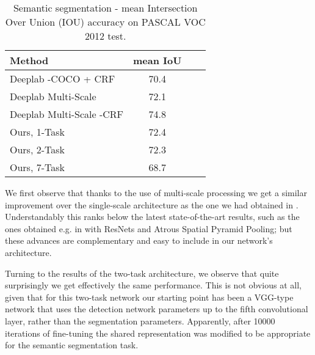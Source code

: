 \documentclass[10pt,twocolumn,letterpaper]{article}
\begin{document}
\begin{table}[!h]
	\begin{tabular}{|l|c|c|c|}
		\hline
	Method	& mean IoU \\\hline\hline
		Deeplab -COCO + CRF \cite{papa15}& 70.4\\\hline
		Deeplab Multi-Scale \cite{iclr16} & 72.1 \\
		Deeplab Multi-Scale -CRF \cite{iclr16} & 74.8 \\\hline
		Ours, 1-Task  & 72.4\\
		Ours, 2-Task  & 72.3\\
		Ours, 7-Task & 68.7 \\\hline
	\end{tabular}
	\caption{Semantic segmentation  - mean Intersection Over Union (IOU) accuracy on PASCAL VOC 2012 test.\label{table:results_e}}
\end{table}
We first observe that thanks to the use of multi-scale processing we get  a similar improvement over the single-scale architecture as the one we had obtained in \cite{iclr16}.
Understandably this ranks below the latest state-of-the-art results, such as the ones obtained e.g. in \cite{ChenPK0Y16} with ResNets and Atrous Spatial Pyramid Pooling; but these advances are complementary and easy to include in our network's architecture. 

Turning to the results of the two-task architecture, we observe that quite surprisingly we get effectively the same performance. This is not obvious at all, given that for this two-task network our starting point has been a VGG-type network that uses the detection network parameters up to the fifth convolutional layer, rather than the segmentation parameters. Apparently, after 10000 iterations of fine-tuning the shared representation was modified to be appropriate for the semantic segmentation task.
\end{document}
